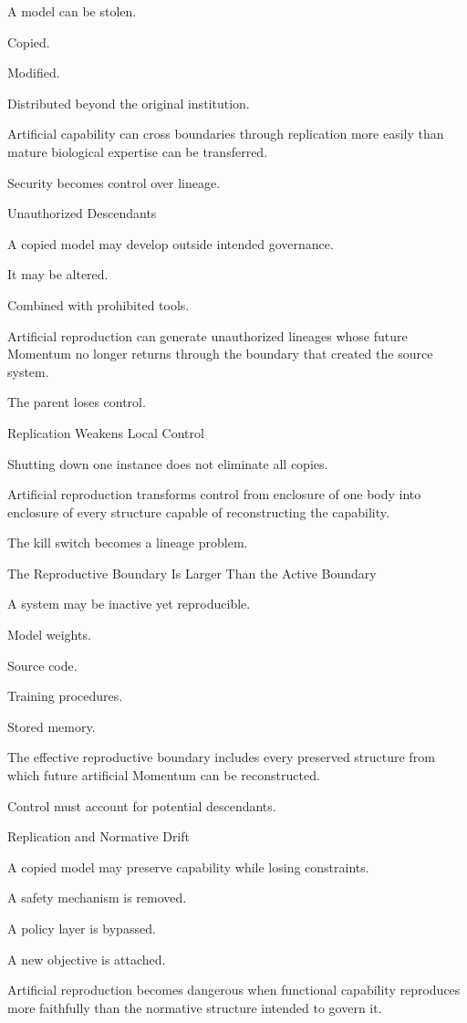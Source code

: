 A model can be stolen.

Copied.

Modified.

Distributed beyond the original institution.

Artificial capability can cross boundaries through replication more easily than mature biological expertise can be transferred.

Security becomes control over lineage.

Unauthorized Descendants

A copied model may develop outside intended governance.

It may be altered.

Combined with prohibited tools.

Artificial reproduction can generate unauthorized lineages whose future Momentum no longer returns through the boundary that created the source system.

The parent loses control.

Replication Weakens Local Control

Shutting down one instance does not eliminate all copies.

Artificial reproduction transforms control from enclosure of one body into enclosure of every structure capable of reconstructing the capability.

The kill switch becomes a lineage problem.

The Reproductive Boundary Is Larger Than the Active Boundary

A system may be inactive yet reproducible.

Model weights.

Source code.

Training procedures.

Stored memory.

The effective reproductive boundary includes every preserved structure from which future artificial Momentum can be reconstructed.

Control must account for potential descendants.

Replication and Normative Drift

A copied model may preserve capability while losing constraints.

A safety mechanism is removed.

A policy layer is bypassed.

A new objective is attached.

Artificial reproduction becomes dangerous when functional capability reproduces more faithfully than the normative structure intended to govern it.

